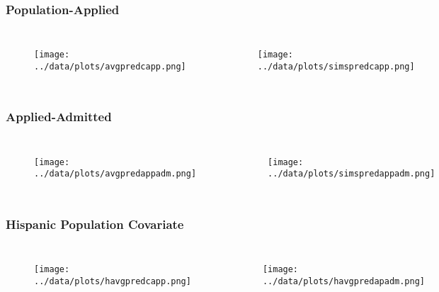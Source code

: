 \documentclass{beamer}
\begin{document}
\begin{frame}
\frametitle{Population-Applied}
\begin{columns}[c] %

\begin{figure}
\texttt{[image: ../data/plots/avgpredcapp.png]}
\end{figure}

\begin{figure}
\texttt{[image: ../data/plots/simspredcapp.png]}
\end{figure}

\end{columns}
\end{frame}


\begin{frame}
\frametitle{Applied-Admitted}
\begin{columns}[c] %

\begin{figure}
\texttt{[image: ../data/plots/avgpredappadm.png]}
\end{figure}

\begin{figure}
\texttt{[image: ../data/plots/simspredappadm.png]}
\end{figure}

\end{columns}
\end{frame}


\begin{frame}
\frametitle{Hispanic Population Covariate}
\begin{columns}[c] %

\begin{figure}
\texttt{[image: ../data/plots/havgpredcapp.png]}
\end{figure}

\begin{figure}
\texttt{[image: ../data/plots/havgpredapadm.png]}
\end{figure}

\end{columns}
\end{frame}
\end{document}
